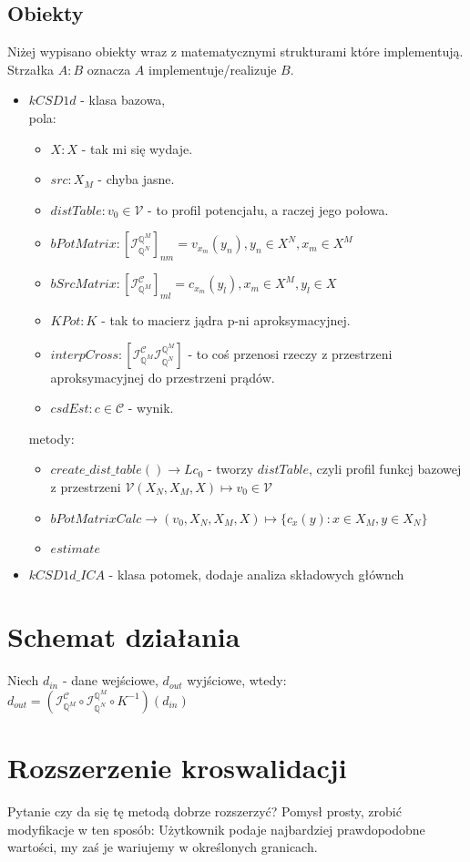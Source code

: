 \documentclass[9pt]{article}
\newcommand{\Q}{\mathbb{Q}}
\newcommand{\V}{\mathcal{V}}
\newcommand{\C}{\mathcal{C}}
\newcommand{\IC}{ \mathcal{I}_{\Q^M}^{\C}}
\newcommand{\IV}{ \mathcal{I}_{\Q^N}^{\Q^M}}
\begin{document}
\subsection{Obiekty}
Niżej wypisano obiekty wraz z matematycznymi strukturami które implementują.
Strzałka $A : B $ oznacza $A$ implementuje/realizuje $B$.
\begin{itemize}
    \item $kCSD1d$ -  klasa bazowa, \\
    pola:
    \begin{itemize}
        \item $X : X$ -  tak mi się wydaje.
        \item $src : X_M$ - chyba jasne.
        \item $distTable : v_0 \in \V$ - to profil potencjału, a raczej jego połowa.
        \item $bPotMatrix : [\IV]_{nm} = v_{x_m}(y_n), y_n\in X^N, x_m\in X^M$
        \item $bSrcMatrix : [\IC]_{ml} = c_{x_m}(y_l), x_m\in X^M, y_l\in X$ 
        \item $KPot : K$ - tak to macierz jądra p-ni aproksymacyjnej.
        \item $interpCross :[\IC \IV] $ - to coś przenosi rzeczy z przestrzeni
        aproksymacyjnej do przestrzeni prądów.
        \item $csdEst: c \in \C$ - wynik.
    \end{itemize}
    metody:
    \begin{itemize}
        \item $create\_dist\_table() \to  Lc_0$ - tworzy $distTable$, czyli profil funkcj 
        bazowej z przestrzeni $\V (X_N,X_M,X) \mapsto v_0 \in \V$
        \item $bPotMatrixCalc \to (v_0, X_N,X_M,X)\mapsto \{c_x(y):x\in X_M, y\in X_N \}$ 
        \item $estimate$
    \end{itemize}
    \item $kCSD1d\_ICA$ - klasa potomek, dodaje analiza składowych głównch
\end{itemize}

\section{Schemat działania}
Niech $d_{in}$ - dane wejściowe, $d_{out}$ wyjściowe, wtedy:
$d_{out}= (\IC \circ \IV \circ K^{-1} )( d_{in})$


\section{Rozszerzenie kroswalidacji}
Pytanie czy da się tę metodą dobrze rozszerzyć?
Pomysł prosty, zrobić modyfikacje w ten sposób:
Użytkownik podaje najbardziej prawdopodobne wartości, my zaś je wariujemy w
określonych granicach.
\end{document}
